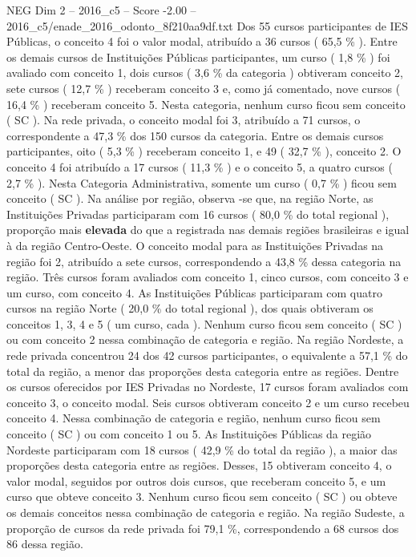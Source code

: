 \begin{textsample}{NEG Dim 2 – 2016\_c5 – Score -2.00 – 2016\_c5/enade\_2016\_odonto\_8f210aa9df.txt}
Dos 55 cursos participantes de IES Públicas, o conceito 4 foi o valor modal, atribuído a 36 cursos ( 65,5 \% ).
Entre os demais cursos de Instituições Públicas participantes, um curso ( 1,8 \% ) foi avaliado com conceito 1, dois cursos ( 3,6 \% da categoria ) obtiveram conceito 2, sete cursos ( 12,7 \% ) receberam conceito 3 e, como já comentado, nove cursos ( 16,4 \% ) receberam conceito 5.
Nesta categoria, nenhum curso ficou sem conceito ( SC ).
Na rede privada, o conceito modal foi 3, atribuído a 71 cursos, o correspondente a 47,3 \% dos 150 cursos da categoria.
Entre os demais cursos participantes, oito ( 5,3 \% ) receberam conceito 1, e 49 ( 32,7 \% ), conceito 2.
O conceito 4 foi atribuído a 17 cursos ( 11,3 \% ) e o conceito 5, a quatro cursos ( 2,7 \% ).
Nesta Categoria Administrativa, somente um curso ( 0,7 \% ) ficou sem conceito ( SC ).
Na análise por região, observa -se que, na região Norte, as Instituições Privadas participaram com 16 cursos ( 80,0 \% do total regional ), proporção mais \textbf{elevada} do que a registrada nas demais regiões brasileiras e igual à da região Centro-Oeste.
O conceito modal para as Instituições Privadas na região foi 2, atribuído a sete cursos, correspondendo a 43,8 \% dessa categoria na região.
Três cursos foram avaliados com conceito 1, cinco cursos, com conceito 3 e um curso, com conceito 4.
As Instituições Públicas participaram com quatro cursos na região Norte ( 20,0 \% do total regional ), dos quais obtiveram os conceitos 1, 3, 4 e 5 ( um curso, cada ).
Nenhum curso ficou sem conceito ( SC ) ou com conceito 2 nessa combinação de categoria e região.
Na região Nordeste, a rede privada concentrou 24 dos 42 cursos participantes, o equivalente a 57,1 \% do total da região, a menor das proporções desta categoria entre as regiões.
Dentre os cursos oferecidos por IES Privadas no Nordeste, 17 cursos foram avaliados com conceito 3, o conceito modal.
Seis cursos obtiveram conceito 2 e um curso recebeu conceito 4.
Nessa combinação de categoria e região, nenhum curso ficou sem conceito ( SC ) ou com conceito 1 ou 5.
As Instituições Públicas da região Nordeste participaram com 18 cursos ( 42,9 \% do total da região ), a maior das proporções desta categoria entre as regiões.
Desses, 15 obtiveram conceito 4, o valor modal, seguidos por outros dois cursos, que receberam conceito 5, e um curso que obteve conceito 3.
Nenhum curso ficou sem conceito ( SC ) ou obteve os demais conceitos nessa combinação de categoria e região.
Na região Sudeste, a proporção de cursos da rede privada foi 79,1 \%, correspondendo a 68 cursos dos 86 dessa região.

\end{textsample}
